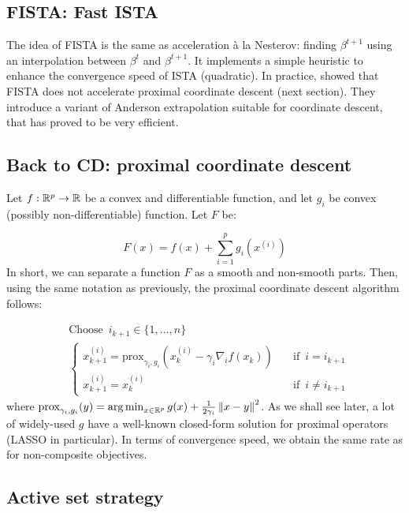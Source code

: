 \documentclass[a4paper,10pt]{article}
\theoremstyle{definition}
\begin{document}
\subsection*{FISTA: Fast ISTA}

The idea of FISTA is the same as acceleration à la Nesterov: finding $\beta^{t+1}$ using
an interpolation between $\beta^t$ and $\beta^{t+1}$. It implements a simple heuristic to
enhance the convergence speed of ISTA (quadratic). In practice, \cite{Bertrand_Massias_Anderson}
showed that FISTA does not accelerate proximal coordinate descent (next section). They
introduce a variant of Anderson extrapolation suitable for coordinate descent, that has
proved to be very efficient.

\subsection*{Back to CD: proximal coordinate descent}

Let $f : \mathbb{R}^p \rightarrow \mathbb{R}$ be a convex and differentiable function, and let
$g_i$ be convex (possibly non-differentiable) function. Let $F$ be:

\begin{equation*}
    F(x) = f(x) + \sum_{i=1}^p g_i(x^{(i)})
\end{equation*}
%
In short, we can separate a function $F$ as a smooth and non-smooth parts. Then, using the same notation
as previously, the proximal coordinate descent algorithm follows:

\begin{align*}
     & \text{Choose} \enspace i_{k+1} \in \{1, \dots, n\} \\
     & \begin{cases}
        x_{k+1}^{(i)} = \text{prox}_{\gamma_i, g_i}(x_k^{(i)} - \gamma_i \nabla_i f(x_k)) \quad & \text{if} \enspace i = i_{k+1}    \\
        x_{k+1}^{(i)} = x_{k}^{(i)} \quad                                                       & \text{if} \enspace i \neq i_{k+1}
    \end{cases}
\end{align*}
%
where $\text{prox}_{\gamma_i, g_i}(y)=\operatorname*{arg\,min}_{x \in \mathbb{R}^p} g(x) + \frac{1}{2\gamma_i} \left \lVert x-y \right \rVert^2$.
As we shall see later, a lot of widely-used $g$ have a well-known closed-form solution for proximal operators
(LASSO in particular).
%
In terms of convergence speed, we obtain the same rate as for non-composite objectives.

\subsection*{Active set strategy}
\end{document}

